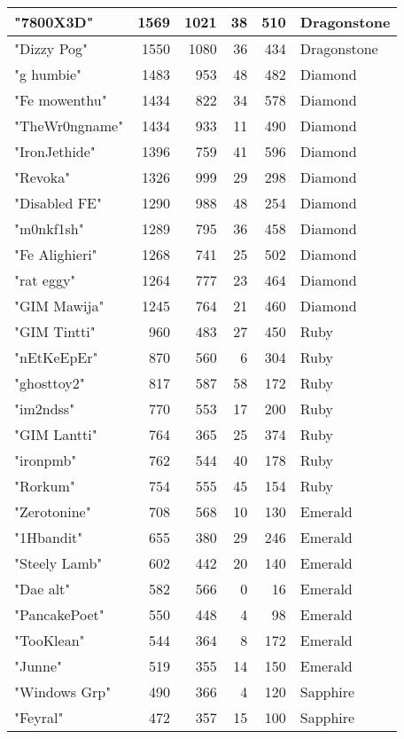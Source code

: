 \documentclass{article}
\begin{document}
\begin{table}[htbp]
\begin{tabular}{|l|r|r|r|r|l|}
"7800X3D" & 1569 & 1021 & 38 & 510 & Dragonstone \\ \hline
"Dizzy Pog" & 1550 & 1080 & 36 & 434 & Dragonstone \\ \hline
"g humbie" & 1483 & 953 & 48 & 482 & Diamond \\ \hline
"Fe mowenthu" & 1434 & 822 & 34 & 578 & Diamond \\ \hline
"TheWr0ngname" & 1434 & 933 & 11 & 490 & Diamond \\ \hline
"IronJethide" & 1396 & 759 & 41 & 596 & Diamond \\ \hline
"Revoka" & 1326 & 999 & 29 & 298 & Diamond \\ \hline
"Disabled FE" & 1290 & 988 & 48 & 254 & Diamond \\ \hline
"m0nkf1sh" & 1289 & 795 & 36 & 458 & Diamond \\ \hline
"Fe Alighieri" & 1268 & 741 & 25 & 502 & Diamond \\ \hline
"rat eggy" & 1264 & 777 & 23 & 464 & Diamond \\ \hline
"GIM Mawija" & 1245 & 764 & 21 & 460 & Diamond \\ \hline
"GIM Tintti" & 960 & 483 & 27 & 450 & Ruby \\ \hline
"nEtKeEpEr" & 870 & 560 & 6 & 304 & Ruby \\ \hline
"ghosttoy2" & 817 & 587 & 58 & 172 & Ruby \\ \hline
"im2ndss" & 770 & 553 & 17 & 200 & Ruby \\ \hline
"GIM Lantti" & 764 & 365 & 25 & 374 & Ruby \\ \hline
"ironpmb" & 762 & 544 & 40 & 178 & Ruby \\ \hline
"Rorkum" & 754 & 555 & 45 & 154 & Ruby \\ \hline
"Zerotonine" & 708 & 568 & 10 & 130 & Emerald \\ \hline
"1Hbandit" & 655 & 380 & 29 & 246 & Emerald \\ \hline
"Steely Lamb" & 602 & 442 & 20 & 140 & Emerald \\ \hline
"Dae alt" & 582 & 566 & 0 & 16 & Emerald \\ \hline
"PancakePoet" & 550 & 448 & 4 & 98 & Emerald \\ \hline
"TooKlean" & 544 & 364 & 8 & 172 & Emerald \\ \hline
"Junne" & 519 & 355 & 14 & 150 & Emerald \\ \hline
"Windows Grp" & 490 & 366 & 4 & 120 & Sapphire \\ \hline
"Feyral" & 472 & 357 & 15 & 100 & Sapphire \\ \hline

\end{tabular}
\end{table}
\end{document}

